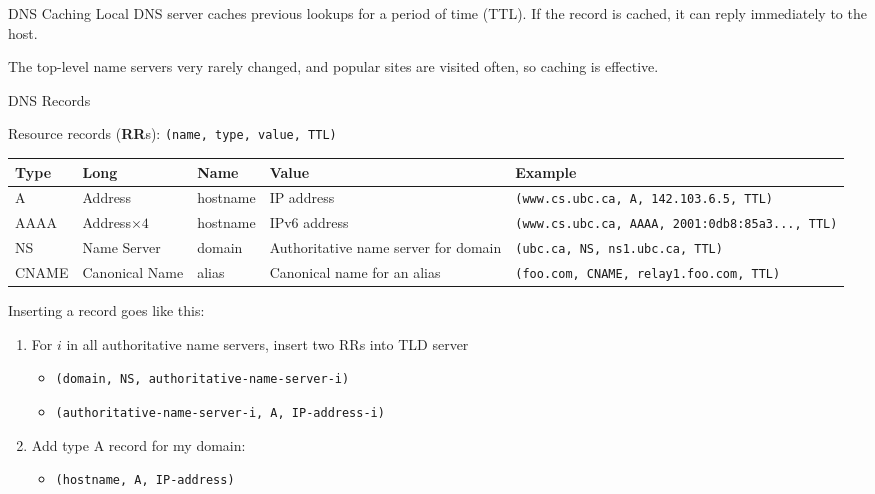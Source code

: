 \begin{theorem}
    {DNS Caching}
    Local DNS server caches previous lookups for a period of time (TTL). If the record is cached, it can reply immediately to the host.

    The top-level name servers very rarely changed, and popular sites are visited often, so caching is effective.
\end{theorem}

\begin{definition}
    {DNS Records}

    Resource records (\textbf{RR}s): \texttt{(name, type, value, TTL)}

    \begin{tabular}{|lllp{3cm}|p{5cm}|}
        \hline
        \textbf{Type} & \textbf{Long}    & \textbf{Name} & \textbf{Value}                       & \textbf{Example}                                       \\
        \hline
        A             & Address          & hostname      & IP address                           & \texttt{(www.cs.ubc.ca, A, 142.103.6.5, TTL)}
        \\
        AAAA          & Address$\times4$ & hostname      & IPv6 address                         & \texttt{(www.cs.ubc.ca, AAAA, 2001:0db8:85a3..., TTL)}
        \\
        NS            & Name Server      & domain        & Authoritative name server for domain & \texttt{(ubc.ca, NS, ns1.ubc.ca, TTL)}
        \\
        CNAME         & Canonical Name   & alias         & Canonical name for an alias          & \texttt{(foo.com, CNAME, relay1.foo.com, TTL)}
        \\
        \hline
    \end{tabular}

    Inserting a record goes like this:
    \begin{enumerate}
        \item For $i$ in all authoritative name servers, insert two RRs into TLD server
              \begin{itemize}
                  \item \texttt{(domain, NS, authoritative-name-server-i)}
                  \item \texttt{(authoritative-name-server-i, A, IP-address-i)}
              \end{itemize}
        \item Add type A record for my domain:
              \begin{itemize}
                  \item \texttt{(hostname, A, IP-address)}
              \end{itemize}
    \end{enumerate}
\end{definition}

